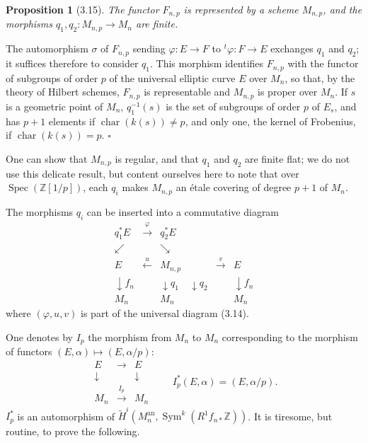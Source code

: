 \documentclass[10pt]{article}
\newcommand{\Z}{\mathbb Z}
\newcommand{\Sym}{\operatorname{Sym}}
\newcommand{\Spec}{\operatorname{Spec}}
\newcommand{\an}{\mathrm{an}}
\newcommand{\QED}{\hfill$\square$}
\newcommand{\charop}{\operatorname{char}}
\newtheorem*{proposition}{Proposition}
\begin{document}
\begin{proposition}[3.15]
The functor $F_{n,p}$ is represented by a scheme $M_{n,p}$, and the morphisms $q_1,q_2:M_{n,p}\to M_n$ are finite.
\end{proposition}

The automorphism $\sigma$ of $F_{n,p}$ sending $\varphi:E\to F$ to ${}^{t}\!\varphi:F\to E$ exchanges $q_1$ and $q_2$; it suffices therefore to consider $q_1$. This morphism identifies $F_{n,p}$ with the functor of subgroups of order $p$ of the universal elliptic curve $E$ over $M_n$, so that, by the theory of Hilbert schemes, $F_{n,p}$ is representable and $M_{n,p}$ is proper over $M_n$. If $s$ is a geometric point of $M_n$, $q_1^{-1}(s)$ is the set of subgroups of order $p$ of $E_s$, and has $p+1$ elements if $\charop(k(s))\ne p$, and only one, the kernel of Frobenius, if $\charop(k(s))=p$. \QED

One can show that $M_{n,p}$ is regular, and that $q_1$ and $q_2$ are finite flat; we do not use this delicate result, but content ourselves here to note that over $\Spec(\Z[1/p])$, each $q_i$ makes $M_{n,p}$ an étale covering of degree $p+1$ of $M_n$.

The morphisms $q_i$ can be inserted into a commutative diagram
\[
\begin{array}{ccccc}
q_1^*E & \xrightarrow{\ \varphi\ } & q_2^*E &&\\[-0.2em]
\swarrow && \searrow &&\\[-0.2em]
E & \xleftarrow{\ u\ } & M_{n,p} & \xrightarrow{\ v\ } & E\\[-0.2em]
\downarrow f_n && \downarrow q_1\quad\downarrow q_2 && \downarrow f_n\\[-0.2em]
M_n && M_n && M_n
\end{array}
\tag{3.16}
\]
where $(\varphi,u,v)$ is part of the universal diagram (3.14).

One denotes by $I_p$ the morphism from $M_n$ to $M_n$ corresponding to the morphism of functors $(E,\alpha)\mapsto (E,\alpha/p)$:
\[
\begin{array}{ccc}
E&\longrightarrow&E\\
\downarrow&&\downarrow\\
M_n&\xrightarrow{\ I_p\ }&M_n
\end{array}
\qquad
I_p^*(E,\alpha)=(E,\alpha/p).
\tag{3.17}
\]
$I_p^*$ is an automorphism of $\widetilde H^i(M_n^{\an},\Sym^k(R^1f_{n*}\Z))$. It is tiresome, but routine, to prove the following.
\end{document}
